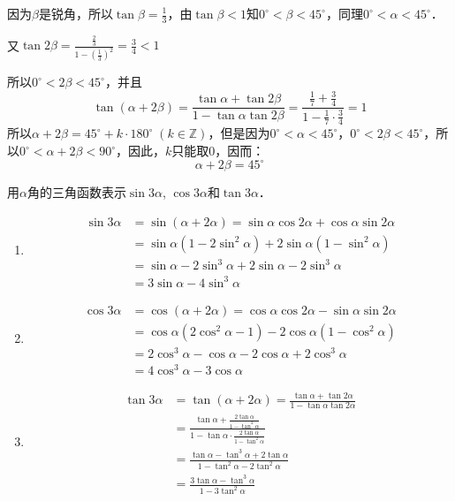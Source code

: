 \begin{solution}
因为$\beta$是锐角，所以$\tan\beta=\frac{1}{3}$，由$\tan\beta<1$知$0^{\circ}<\beta<45^{\circ}$，同理$0^{\circ}<\alpha<45^{\circ}$．

又$\tan2\beta=\frac{\frac{2}{3}}{1-\left(\frac{1}{3}\right)^2}=\frac{3}{4}<1$

所以$0^{\circ}<2\beta <45^{\circ}$，并且
\[\tan(\alpha+2\beta)=\frac{\tan \alpha+\tan2\beta}{1-\tan \alpha\tan2\beta}=\frac{\frac{1}{7}+\frac{3}{4}}{1-\frac{1}{7}\cdot \frac{3}{4}}=1\]
所以$\alpha+2\beta=45^{\circ}+k\cdot 180^{\circ}\; (k\in\mathbb{Z})$，但是因为$0^{\circ}<\alpha<45^{\circ}$，$0^{\circ}<2\beta <45^{\circ}$，所以$0^{\circ}<\alpha+2\beta<90^{\circ}$，因此，$k$只能取0，因而：
\[\alpha+2\beta=45^{\circ}\]
\end{solution}


\begin{example}
用$\alpha$角的三角函数表示$\sin3\alpha$, $\cos3\alpha$和$\tan3\alpha$．
\end{example}



\begin{solution}
\begin{enumerate}
    \item \[\begin{split}
        \sin3\alpha&=\sin(\alpha+2\alpha)=\sin\alpha \cos2\alpha+\cos\alpha\sin2\alpha\\
        &=\sin\alpha(1-2\sin^2\alpha)+2\sin\alpha(1-\sin^2\alpha) \\
        &=\sin\alpha-2\sin^3\alpha+2\sin\alpha-2\sin^3\alpha\\
        &=3\sin\alpha-4\sin^3\alpha     
    \end{split}\]
    \item \[\begin{split}
       \cos3\alpha&=\cos(\alpha+2\alpha)=\cos\alpha\cos2\alpha-\sin\alpha\sin2\alpha\\
       &=\cos\alpha(2\cos^2\alpha-1)-2\cos\alpha(1-\cos^2\alpha)\\
       &=2\cos^3\alpha-\cos\alpha-2\cos\alpha+2\cos^3\alpha\\
       &=4\cos^3\alpha-3\cos\alpha 
    \end{split}\]
    \item \[\begin{split}
\tan3\alpha&=\tan(\alpha+2\alpha)=\frac{\tan\alpha+\tan2\alpha}{1-\tan\alpha\tan2\alpha}\\
&=\frac{\tan\alpha+\frac{2\tan\alpha}{1-\tan^2\alpha}}{1-\tan\alpha\cdot \frac{2\tan\alpha}{1-\tan^2\alpha}}\\
&=\frac{\tan\alpha-\tan^3\alpha+2\tan\alpha}{1-\tan^2\alpha-2\tan^2\alpha}\\
&=\frac{3\tan\alpha-\tan^3\alpha}{1-3\tan^2\alpha}        
    \end{split}\]
\end{enumerate}
\end{solution}

